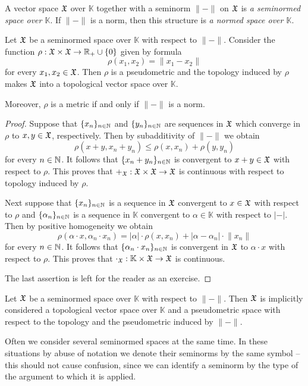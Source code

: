 \begin{definition}
   A vector space ${\mathfrak X}$ over $\mathbb{K}$ together with a seminorm $\lVert - \rVert$ on ${\mathfrak X}$ is \textit{a seminormed space over $\mathbb{K}$}. If $\lVert - \rVert$ is a norm, then this structure is \textit{a normed space over $\mathbb{K}$}.
\end{definition}

\begin{fact}\label{fact:topology_induced_by_seminorm}
   Let ${\mathfrak X}$ be a seminormed space over $\mathbb{K}$ with respect to $\lVert - \rVert$. Consider the function $\rho:{\mathfrak X}\times {\mathfrak X} \rightarrow {\mathbb R}_+\cup \{0\}$ given by formula
   $$\rho(x_1,x_2) = \lVert x_1 - x_2 \rVert$$
   for every $x_1, x_2\in {\mathfrak X}$. Then $\rho$ is a pseudometric and the topology induced by $\rho$ makes ${\mathfrak X}$ into a topological vector space over $\mathbb{K}$.

   Moreover, $\rho$ is a metric if and only if $\lVert-\rVert$ is a norm.
\end{fact}
\begin{proof}
   Suppose that $\{x_n\}_{n\in {\mathbb N}}$ and $\{y_n\}_{n\in {\mathbb N}}$ are sequences in ${\mathfrak X}$ which converge in $\rho$ to $x,y \in {\mathfrak X}$, respectively. Then by subadditivity of $\lVert-\rVert$ we obtain
   $$\rho(x + y,x_n + y_n) \leq \rho(x,x_n) + \rho(y,y_n)$$
   for every $n \in {\mathbb N}$. It follows that $\{x_n + y_n\}_{n\in {\mathbb N}}$ is convergent to $x + y \in {\mathfrak X}$ with respect to $\rho$. This proves that $+_{{\mathfrak X}}:{\mathfrak X}\times {\mathfrak X}\rightarrow {\mathfrak X}$ is continuous with respect to topology induced by $\rho$.

   Next suppose that $\{x_n\}_{n\in {\mathbb N}}$ is a sequence in ${\mathfrak X}$ convergent to $x \in {\mathfrak X}$ with respect to $\rho$ and $\{\alpha_n\}_{n\in {\mathbb N}}$ is a sequence in $\mathbb{K}$ convergent to $\alpha \in \mathbb{K}$ with respect to $|-|$. Then by positive homogeneity we obtain
   $$\rho(\alpha\cdot x, \alpha_n\cdot x_n) = |\alpha|\cdot \rho(x,x_n) + |\alpha - \alpha_n|\cdot \lVert x_n \rVert$$
   for every $n \in {\mathbb N}$. It follows that $\{\alpha_n\cdot x_n\}_{n\in {\mathbb N}}$ is convergent in ${\mathfrak X}$ to $\alpha\cdot x$ with respect to $\rho$. This proves that $\cdot_{{\mathfrak X}}:\mathbb{K}\times {\mathfrak X} \rightarrow {\mathfrak X}$ is continuous.

   The last assertion is left for the reader as an exercise.
\end{proof}

\begin{remark}\label{remark:topology_induced_by_seminorm_is_canonical}
   Let ${\mathfrak X}$ be a seminormed space over $\mathbb{K}$ with respect to $\lVert - \rVert$. Then ${\mathfrak X}$ is implicitly considered a topological vector space over $\mathbb{K}$ and a pseudometric space with respect to the topology and the pseudometric induced by $\lVert - \rVert$.
\end{remark}
\noindent
Often we consider several seminormed spaces at the same time. In these situations by abuse of notation we denote their seminorms by the same symbol – this should not cause confusion, since we can identify a seminorm by the type of the argument to which it is applied. 

